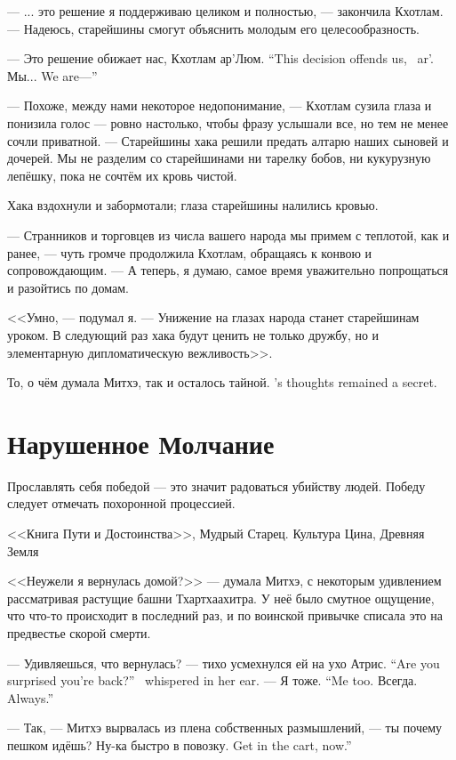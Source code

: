 ---  ... это решение я поддерживаю целиком и полностью, --- закончила Кхотлам.
--- Надеюсь, старейшины смогут объяснить молодым его целесообразность.

{--- Это решение обижает нас, Кхотлам ар'Люм.}
{``This decision offends us, \Kchotlam\ ar'\Loem.}
{Мы...}
{We are---''}

--- Похоже, между нами некоторое недопонимание, --- Кхотлам сузила глаза и понизила голос --- ровно настолько, чтобы фразу услышали все, но тем не менее сочли приватной.
--- Старейшины хака решили предать алтарю наших сыновей и дочерей.
Мы не разделим со старейшинами ни тарелку бобов, ни кукурузную лепёшку, пока не сочтём их кровь чистой.

Хака вздохнули и забормотали;
глаза старейшины налились кровью.

--- Странников и торговцев из числа вашего народа мы примем с теплотой, как и ранее, --- чуть громче продолжила Кхотлам, обращаясь к конвою и сопровождающим.
--- А теперь, я думаю, самое время уважительно попрощаться и разойтись по домам.

<<Умно, --- подумал я.
--- Унижение на глазах народа станет старейшинам уроком.
В следующий раз хака будут ценить не только дружбу, но и элементарную дипломатическую вежливость>>.

{То, о чём думала Митхэ, так и осталось тайной.}
{\Mitchoe's thoughts remained a secret.}

\section{Нарушенное Молчание}

\epigraph
{Прославлять себя победой --- это значит радоваться убийству людей.
Победу следует отмечать похоронной процессией.}
{<<Книга Пути и Достоинства>>, Мудрый Старец.
Культура Цина, Древняя Земля}

<<Неужели я вернулась домой?>> --- думала Митхэ, с некоторым удивлением рассматривая растущие башни Тхартхаахитра.
У неё было смутное ощущение, что что-то происходит в последний раз, и по воинской привычке списала это на предвестье скорой смерти.

{--- Удивляешься, что вернулась? --- тихо усмехнулся ей на ухо Атрис.}
{``Are you surprised you're back?'' \Aatris\ whispered in her ear.}
{--- Я тоже.}
{``Me too.}
{Всегда.}
{Always.''}

--- Так, --- Митхэ вырвалась из плена собственных размышлений, --- ты почему пешком идёшь?
{Ну-ка быстро в повозку.}
{Get in the cart, now.''}

